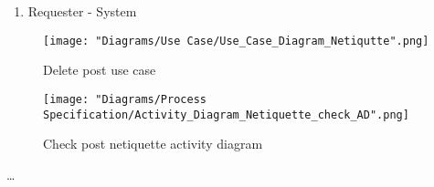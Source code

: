 \documentclass[12pt]{article}
\begin{document}
\begin{enumerate}
\begin{enumerate}
\begin{enumerate}
   	 	\end{enumerate}
   	 	\item Requester - System
  	\end{enumerate}
  	\begin{figure}[h]
  		\centering
  		\texttt{[image: "Diagrams/Use Case/Use\_Case\_Diagram\_Netiqutte".png]}
  		\caption{Delete post use case}
  	\end{figure}
  	\begin{figure}[h]
  		\centering
  		\texttt{[image: "Diagrams/Process Specification/Activity\_Diagram\_Netiquette\_check\_AD".png]}
  		\caption{Check post netiquette activity diagram}
  	\end{figure}
  	\clearpage
  	\newpage
  \ldots
\end{enumerate}




\clearpage
\end{document}
